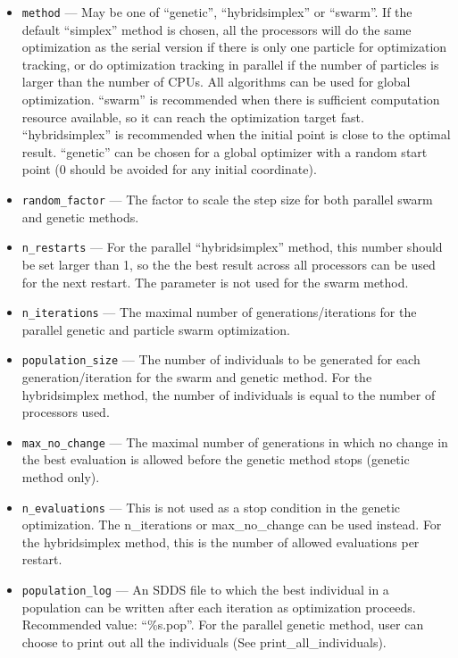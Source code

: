 \documentclass[11pt]{article}
\begin{document}
\begin{itemize}
\item \verb|method| --- May be one of ``genetic'', ``hybridsimplex'' or ``swarm''. If the default ``simplex'' method is chosen, all the processors will do the same optimization as the serial version if there is only one particle for optimization tracking, or do optimization tracking in parallel if the number of particles is larger than the number of CPUs. All algorithms can be used for global optimization. ``swarm'' is recommended when there is sufficient computation resource available, so it can reach the optimization target fast. ``hybridsimplex'' is recommended when the initial point is close to the optimal result. ``genetic'' can be chosen for a global optimizer with a random start point (0 should be avoided for any initial coordinate). 

\item \verb|random_factor| --- The factor to scale the step size for both parallel swarm and genetic methods.

\item \verb|n_restarts| --- For the parallel ``hybridsimplex'' method, this number should be set larger than 1, so the the best result across all processors can be used for the next restart. The parameter is not used for the swarm method.

\item \verb|n_iterations| --- The maximal number of generations/iterations for the parallel genetic and particle swarm optimization. 

\item \verb|population_size| --- The number of individuals to be generated for each generation/iteration for the swarm and genetic method. For the hybridsimplex method, the number of individuals is equal to the number of processors used.

\item \verb|max_no_change| --- The maximal number of generations in which no change in the best evaluation is allowed before the genetic method stops (genetic method only).

\item \verb|n_evaluations| --- This is not used as a stop condition in the genetic optimization. The n\_iterations or max\_no\_change can be used instead. For the hybridsimplex method, this is the number of allowed evaluations per restart. 

\item \verb|population_log| --- An SDDS file to which the best individual in a population can be written after each iteration as optimization proceeds. Recommended value: ``\%s.pop''. For the parallel genetic method, user can choose to print out all the individuals (See print\_all\_individuals).


\end{itemize}
\end{document}
